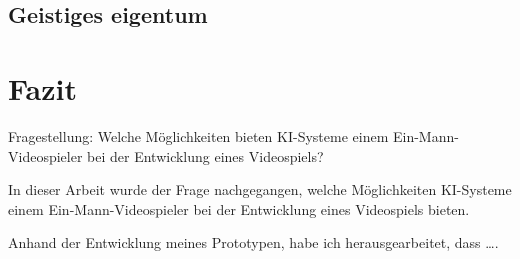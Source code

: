 \documentclass[10pt,a4paper,bibliography=totocnumbered,listof=totocnumbered]{scrartcl}
\begin{document}
\subsection{Geistiges eigentum}%

\section{Fazit}

Fragestellung: Welche Möglichkeiten bieten KI-Systeme einem Ein-Mann-Videospieler bei der Entwicklung eines Videospiels?  

In dieser Arbeit wurde der Frage nachgegangen, welche Möglichkeiten KI-Systeme einem Ein-Mann-Videospieler bei der Entwicklung eines Videospiels bieten. 

Anhand der Entwicklung meines Prototypen, habe ich herausgearbeitet, dass ….
\end{document}
